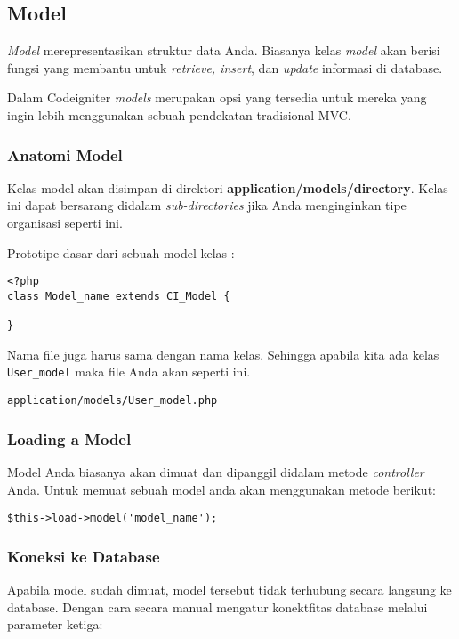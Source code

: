 \begin{enumerate}
\subsection{Model}
\label{subs:model}
\textit{Model} merepresentasikan struktur data Anda. Biasanya kelas \textit {model} akan berisi fungsi yang membantu untuk \textit{retrieve, insert}, dan \textit{update} informasi di database.

Dalam Codeigniter \textit{models} merupakan opsi yang tersedia untuk mereka yang ingin lebih menggunakan sebuah pendekatan tradisional MVC.\cite{codeigniter:17}

\subsubsection{Anatomi Model}
\label{sssec:model_1}

Kelas model akan disimpan di direktori \textbf{application/models/directory}. Kelas ini dapat bersarang didalam \textit{sub-directories} jika Anda menginginkan tipe organisasi seperti ini. \cite{codeigniter:17}

Prototipe dasar dari sebuah model kelas :
\begin{lstlisting}[label=phpheg, frame=single]  
<?php
class Model_name extends CI_Model {

}
\end{lstlisting}

Nama file juga harus sama dengan nama kelas. Sehingga apabila kita ada kelas \verb|User_model| maka file Anda akan seperti ini.

\begin{lstlisting}[label=phpheg, frame=single]  
application/models/User_model.php
\end{lstlisting}

\subsubsection{Loading a Model}
\label{sssec:model_2}

Model Anda biasanya akan dimuat dan dipanggil didalam metode \textit{controller} Anda. Untuk memuat sebuah model anda akan menggunakan metode berikut:\cite{codeigniter:17}

\begin{lstlisting}[label=phpheg, frame=single] 
$this->load->model('model_name');
\end{lstlisting}

\subsubsection{Koneksi ke Database}
\label{sssec:model_3}
Apabila model sudah dimuat, model tersebut tidak terhubung secara langsung ke database. Dengan cara secara manual mengatur konektfitas database melalui parameter ketiga:\cite{codeigniter:17}


\end{enumerate}
